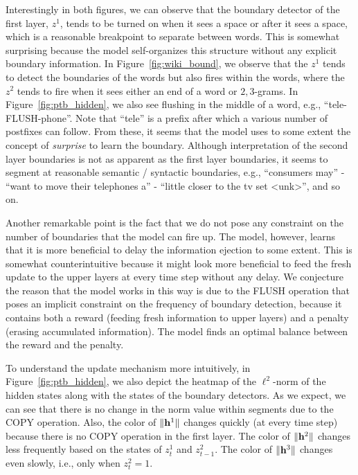 \documentclass{article} %
\begin{document}
Interestingly in both figures, we can observe that the boundary detector of the first layer, $z^1$, 
tends to be turned on when it sees a space or after it sees a space, which is a reasonable breakpoint to separate between words. 
This is somewhat surprising because the model self-organizes this structure without any explicit boundary information.
In Figure~\ref{fig:wiki_bound}, we observe that the $z^1$ tends to detect the boundaries of the words but also fires within the words,
where the $z^2$ tends to fire when it sees either an end of a word or $2,3$-grams.
In Figure~\ref{fig:ptb_hidden}, we also see flushing in the middle of a word, e.g., ``tele-FLUSH-phone''.
Note that ``tele'' is a prefix after which a various number of postfixes can follow. 
From these, it seems that the model uses to some extent the concept of \textit{surprise} to learn the boundary. 
Although interpretation of the second layer boundaries is not as apparent as the first layer boundaries, 
it seems to segment at reasonable semantic / syntactic boundaries, 
e.g.,  ``consumers may'' - ``want to move their telephones a'' - ``little closer to the tv set <unk>'', and so on.

Another remarkable point is the fact that we do not pose any constraint on the number of boundaries that the model can fire up. 
The model, however, learns that it is more beneficial to delay the information ejection to some extent. 
This is somewhat counterintuitive because it might look more beneficial to feed the fresh update to the upper layers at every time step without any delay. 
We conjecture the reason that the model works in this way is due to the FLUSH operation
that poses an implicit constraint on the frequency of boundary detection,
because it contains both a reward (feeding fresh information to upper layers) and a penalty (erasing accumulated information).
The model finds an optimal balance between the reward and the penalty.

To understand the update mechanism more intuitively, in Figure~\ref{fig:ptb_hidden},
we also depict the heatmap of the $\ell^2$-norm of the hidden states along with the states of the boundary detectors. 
As we expect, we can see that there is no change in the norm value within segments due to the COPY operation. 
Also, the color of $\|{\bf h}^1\|$ changes quickly (at every time step) because there is no COPY operation in the first layer. 
The color of $\|{\bf h}^2\|$ changes less frequently based on the states of $z^1_t$ and $z^2_{t-1}$. 
The color of $\|{\bf h}^3\|$ changes even slowly, i.e., only when $z^2_t=1$.
\end{document}
